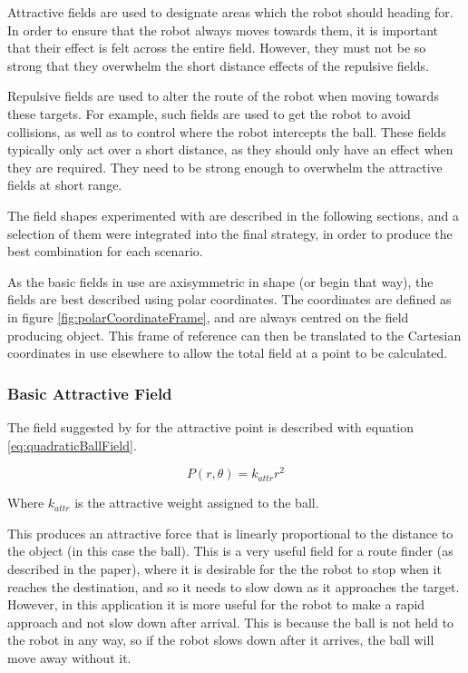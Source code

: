 \documentclass[10pt]{article}
\begin{document}
Attractive fields are used to designate areas which the robot should heading
for. In order to ensure that the robot always moves towards them, it is
important that their effect is felt across the entire field. However, they must
not be so strong that they overwhelm the short distance effects of the repulsive
fields.

Repulsive fields are used to alter the route of the robot when moving towards
these targets. For example, such fields are used to get the robot to avoid
collisions, as well as to control where the robot intercepts the ball. These
fields typically only act over a short distance, as they should only have an
effect when they are required. They need to be strong enough to overwhelm the
attractive fields at short range.

The field shapes experimented with are described in the following sections, and
a selection of them were integrated into the final strategy, in order to produce
the best combination for each scenario.

As the basic fields in use are axisymmetric in shape (or begin that way), the
fields are best described using polar coordinates. The coordinates are defined
as in figure \ref{fig:polarCoordinateFrame}, and are always centred on the field
producing object. This frame of reference can then be translated to the
Cartesian coordinates in use elsewhere to allow the total field at a point to be
calculated.

\subsubsection{Basic Attractive Field\label{sub:Basic-Attractive-Field}}

The field suggested by \cite{intelligentAlgorithmPathPlanning} for the
attractive point is described with equation \ref{eq:quadraticBallField}.

\begin{equation}
P(r,\theta)=k_{attr}r^{2}\label{eq:quadraticBallField}
\end{equation}

Where $k_{attr}$ is the attractive weight assigned to the ball.

This produces an attractive force that is linearly proportional to the distance
to the object (in this case the ball). This is a very useful field for a route
finder (as described in the paper), where it is desirable for the the robot to
stop when it reaches the destination, and so it needs to slow down as it
approaches the target. However, in this application it is more useful for the
robot to make a rapid approach and not slow down after arrival. This is because
the ball is not held to the robot in any way, so if the robot slows down after
it arrives, the ball will move away without it.
\end{document}
